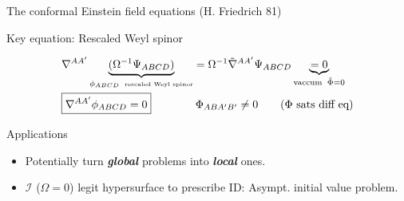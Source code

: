 \documentclass[10pt]{beamer}
\theoremstyle{plain}
\def\bma{{\bm a}}
\def\bmb{{\bm b}}
\def\bmc{{\bm c}}
\def\bme{{\bm e}}
\begin{document}
\begin{frame}{The conformal Einstein field equations (H. Friedrich 81)}
\begin{block}{Key equation: Rescaled Weyl spinor}
\begin{itemize}
\begin{align}
     & \nabla^{AA'} \underbrace{(\Omega^{-1}\Psi_{ABCD})}_{\phi_{ABCD}\;\;\text{\tiny{rescaled Weyl spinor}}}
      = \Omega^{-1}\tilde{\nabla}^{AA'}  \Psi_{ABCD}  \underbrace{=0}_{\text{vaccum}\;\; \tilde{\Phi}=0} \nonumber \\
    & \boxed{\nabla^{AA'}\phi_{ABCD}=0} \qquad \qquad \Phi_{ABA'B'} \neq 0 \qquad \text{($\Phi$ sats diff eq)} \nonumber 
    \end{align}
  \end{itemize}
\end{block}
\vspace{-5mm}
\begin{exampleblock}{Applications}
  \begin{itemize}
    \item Potentially turn {\bf{\emph{global}}} problems into {\bf{\emph{local}}} ones.
  \item $\mathscr{I}$ ($\Omega=0$) legit hypersurface to prescribe ID: Asympt. initial value problem. 
    \end{itemize}
  \end{exampleblock}
\end{frame}
\end{document}
